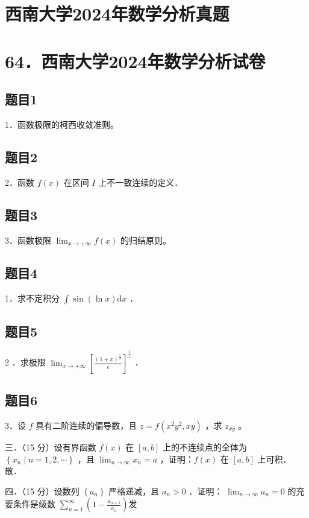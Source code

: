 \documentclass{article}
\begin{document}
\section*{西南大学2024年数学分析真题}
\section*{64．西南大学2024年数学分析试卷}

\subsection{题目1}
1．函数极限的柯西收敛准则。

\subsection{题目2}
2．函数 \(f(x)\) 在区间 \(I\) 上不一致连续的定义．

\subsection{题目3}
3．函数极限 \(\lim _{x \rightarrow+\infty} f(x)\) 的归结原则。

\subsection{题目4}
1．求不定积分 \(\int \sin (\ln x) \mathrm{d} x\) ．

\subsection{题目5}
2 ．求极限 \(\lim _{x \rightarrow+\infty}\left[\frac{(1+x)^{\frac{1}{x}}}{e}\right]^{\frac{1}{x}}\) ．

\subsection{题目6}
3．设 \(f\) 具有二阶连续的偏导数，且 \(z=f\left(x^{2} y^{2}, x y\right)\) ，求 \(z_{x y}\) 。

三．（15 分）设有界函数 \(f(x)\) 在 \([a, b]\) 上的不连续点的全体为 \(\left\{x_{n} \mid n=1,2, \cdots\right\}\) ，且 \(\lim _{n \rightarrow \infty} x_{n}=a\) ，证明：\(f(x)\) 在 \([a, b]\) 上可积．\\
散．

四．（15 分）设数列 \(\left\{a_{n}\right\}\) 严格递减，且 \(a_{n}>0\) ．证明： \(\lim _{n \rightarrow \infty} a_{n}=0\) 的充要条件是级数 \(\sum_{n=1}^{\infty}\left(1-\frac{a_{n+1}}{a_{n}}\right)\)发
\end{document}
